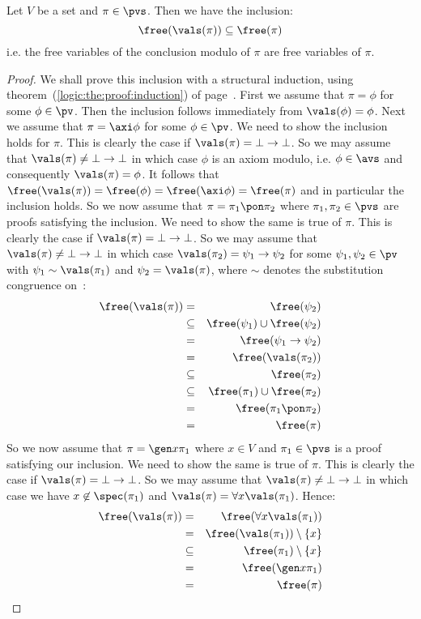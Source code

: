 \begin{prop}\label{logic:prop:FUAP:valuationmod:freevar:conclusion}
Let $V$ be a set and $\pi\in\pvs$. Then we have the inclusion:
    \[
    \free(\vals(\pi))\subseteq\free(\pi)
    \]
i.e. the free variables of the conclusion modulo of $\pi$ are free
variables of $\pi$.
\end{prop}
\begin{proof}
We shall prove this inclusion with a structural induction, using
theorem~(\ref{logic:the:proof:induction}) of
page~\pageref{logic:the:proof:induction}. First we assume that
$\pi=\phi$ for some $\phi\in\pv$. Then the inclusion follows
immediately from $\vals(\phi)=\phi$. Next we assume that
$\pi=\axi\phi$ for some $\phi\in\pv$. We need to show the inclusion
holds for $\pi$. This is clearly the case if
$\vals(\pi)=\bot\to\bot$. So we may assume that
$\vals(\pi)\neq\bot\to\bot$ in which case $\phi$ is an axiom modulo,
i.e. $\phi\in\avs$ and consequently $\vals(\pi)=\phi$. It follows
that $\free(\vals(\pi))=\free(\phi)=\free(\axi\phi)=\free(\pi)$ and
in particular the inclusion holds. So we now assume that
$\pi=\pi_{1}\pon\pi_{2}$ where $\pi_{1},\pi_{2}\in\pvs$ are proofs
satisfying the inclusion. We need to show the same is true of $\pi$.
This is clearly the case if $\vals(\pi)=\bot\to\bot$. So we may
assume that $\vals(\pi)\neq\bot\to\bot$ in which case
$\vals(\pi_{2})=\psi_{1}\to\psi_{2}$ for some
$\psi_{1},\psi_{2}\in\pv$ with $\psi_{1}\sim\vals(\pi_{1})$ and
$\psi_{2}=\vals(\pi)$, where $\sim$ denotes the substitution
congruence on \pv\,:
    \begin{eqnarray*}
    \free(\vals(\pi))&=&\free(\psi_{2})\\
    &\subseteq&\free(\psi_{1})\cup\free(\psi_{2})\\
    &=&\free(\psi_{1}\to\psi_{2})\\
    &=&\free(\vals(\pi_{2}))\\
    &\subseteq&\free(\pi_{2})\\
    &\subseteq&\free(\pi_{1})\cup\free(\pi_{2})\\
    &=&\free(\pi_{1}\pon\pi_{2})\\
    &=&\free(\pi)
    \end{eqnarray*}
So we now assume that $\pi=\gen x\pi_{1}$ where $x\in V$ and
$\pi_{1}\in\pvs$ is a proof satisfying our inclusion. We need to
show the same is true of $\pi$. This is clearly the case if
$\vals(\pi)=\bot\to\bot$. So we may assume that
$\vals(\pi)\neq\bot\to\bot$ in which case we have
$x\not\in\spec(\pi_{1})$ and $\vals(\pi)=\forall x\vals(\pi_{1})$.
Hence:
    \begin{eqnarray*}
    \free(\vals(\pi))&=&\free(\forall x\vals(\pi_{1}))\\
    &=&\free(\vals(\pi_{1}))\setminus\{x\}\\
    &\subseteq&\free(\pi_{1})\setminus\{x\}\\
    &=&\free(\gen x\pi_{1})\\
    &=&\free(\pi)\\
    \end{eqnarray*}
\end{proof}

